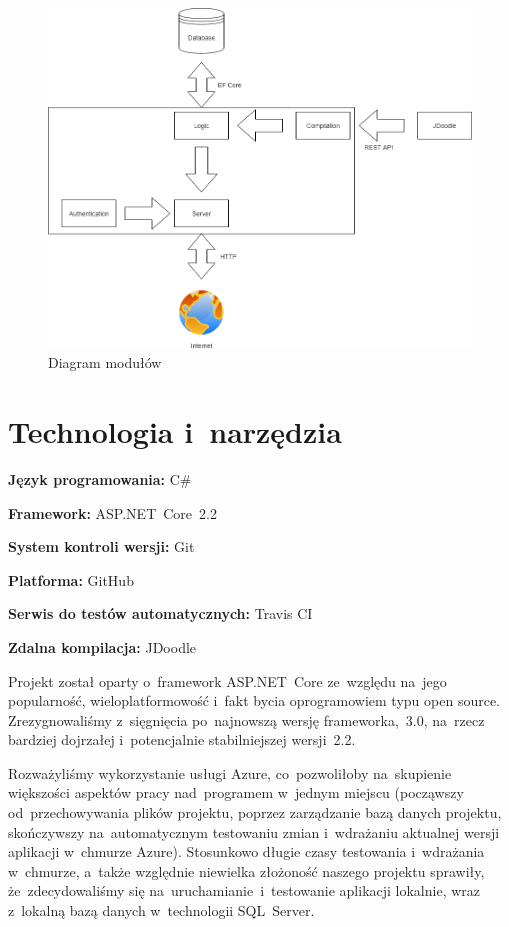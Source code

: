 \documentclass{article}
\begin{document}
\begin{figure}[H]
	\centering
	\includegraphics[width=\linewidth]{projectModules.png}
	\caption{Diagram modułów}
\end{figure}

\section{Technologia i~narzędzia}

\textbf{Język programowania:} C\#

\textbf{Framework:} ASP.NET~Core~2.2

\textbf{System kontroli wersji:} Git

\textbf{Platforma:} GitHub

\textbf{Serwis do testów automatycznych:} Travis CI

\textbf{Zdalna kompilacja:} JDoodle

Projekt został oparty o~framework ASP.NET~Core ze~względu na~jego popularność, wieloplatformowość i~fakt bycia oprogramowiem typu open source. Zrezygnowaliśmy z~sięgnięcia po~najnowszą wersję frameworka,~3.0, na~rzecz bardziej dojrzałej i~potencjalnie stabilniejszej wersji~2.2.

Rozważyliśmy wykorzystanie usługi Azure, co~pozwoliłoby na~skupienie większości aspektów pracy nad~programem w~jednym miejscu (począwszy od~przechowywania plików projektu, poprzez zarządzanie bazą danych projektu, skończywszy na~automatycznym testowaniu zmian i~wdrażaniu aktualnej wersji aplikacji w~chmurze Azure). Stosunkowo długie czasy testowania i~wdrażania w~chmurze, a~także względnie niewielka złożoność naszego projektu sprawiły, że~zdecydowaliśmy się na~uruchamianie~i~testowanie aplikacji lokalnie, wraz z~lokalną bazą danych w~technologii SQL~Server.
\end{document}

